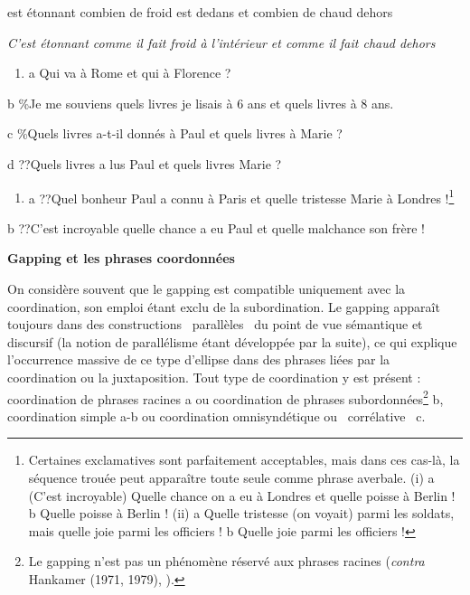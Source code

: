     est  étonnant  combien  de  froid  est  dedans  et  combien  de  chaud  dehors

{\itshape
  C'est étonnant comme il fait froid à l'intérieur et comme il fait chaud dehors}


\begin{enumerate}
\item \label{bkm:Ref299615593}a   Qui va à Rome et qui à Florence ?


\end{enumerate}
  b  \%Je me souviens quels livres je lisais à 6 ans et quels livres à 8 ans.

  c  \%Quels livres a-t-il donnés à Paul et quels livres à Marie ?

  d  ??Quels livres a lus Paul et quels livres Marie ?


\begin{enumerate}
\item a   ??Quel bonheur Paul a connu à Paris et quelle tristesse Marie à Londres !\footnote{Certaines exclamatives sont parfaitement acceptables, mais dans ces cas-là, la séquence trouée peut apparaître toute seule comme phrase averbale. 
(i)  a  (C'est incroyable) Quelle chance on a eu à Londres et quelle poisse à Berlin !
  b  Quelle poisse à Berlin !
(ii)  a  Quelle tristesse (on voyait) parmi les soldats, mais quelle joie parmi les officiers !
  b  Quelle joie parmi les officiers !} 


\end{enumerate}
b  ??C'est incroyable quelle chance a eu Paul et quelle malchance son frère ! 

{\bfseries
Gapping et les phrases coordonnées}

On considère souvent que le gapping est compatible uniquement avec la coordination, son emploi étant exclu de la subordination. Le gapping apparaît toujours dans des constructions {\guillemotleft}~parallèles~{\guillemotright} du point de vue sémantique et discursif (la notion de parallélisme étant développée par la suite), ce qui explique l'occurrence massive de ce type d'ellipse dans des phrases liées par la coordination ou la juxtaposition. Tout type de coordination y est présent : coordination de phrases racines a ou coordination de phrases subordonnées\footnote{Le gapping n'est pas un phénomène réservé aux phrases racines (\textit{contra} Hankamer (1971, 1979), \citet{Ince2009}).} b, coordination simple a-b ou coordination omnisyndétique ou {\guillemotleft}~corrélative~{\guillemotright} c. 


